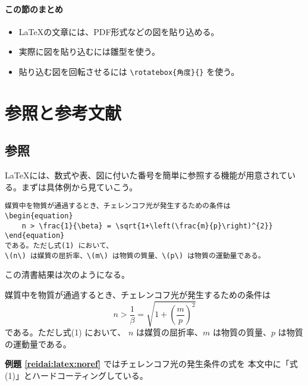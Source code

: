 \paragraph{この節のまとめ}

\begin{itemize}
    \item \LaTeX の文章には、PDF形式などの図を貼り込める。
    \item 実際に図を貼り込むには雛型を使う。
    \item 貼り込む図を回転させるには \verb|\rotatebox{角度}{}| を使う。
\end{itemize}

\section{参照と参考文献}
\label{sec:latex:ref_and_bib}

\subsection{参照}
\label{sec:latex:reference}

\LaTeX には、数式や表、図に付いた番号を簡単に参照する機能が用意されている。まずは具体例から見ていこう。
\begin{reidai}
    \label{reidai:latex:noref}
    \begin{verbatim}
媒質中を物質が通過するとき、チェレンコフ光が発生するための条件は
\begin{equation}
    n > \frac{1}{\beta} = \sqrt{1+\left(\frac{m}{p}\right)^{2}}
\end{equation}
である。ただし式(1) において、
\(n\) は媒質の屈折率、\(m\) は物質の質量、\(p\) は物質の運動量である。
\end{verbatim}
\end{reidai} \noindent
この清書結果は次のようになる。
\begin{kekka}
    媒質中を物質が通過するとき、チェレンコフ光が発生するための条件は
    \begin{equation}
        n > \frac{1}{\beta} = \sqrt{1+\left(\frac{m}{p}\right)^{2}}
    \end{equation}
    である。ただし式(1) において、
    \(n\) は媒質の屈折率、\(m\) は物質の質量、\(p\) は物質の運動量である。\\
\end{kekka} \noindent
\textbf{例題 \ref{reidai:latex:noref}} ではチェレンコフ光の発生条件の式を
本文中に「式(1)」とハードコーティングしている。

